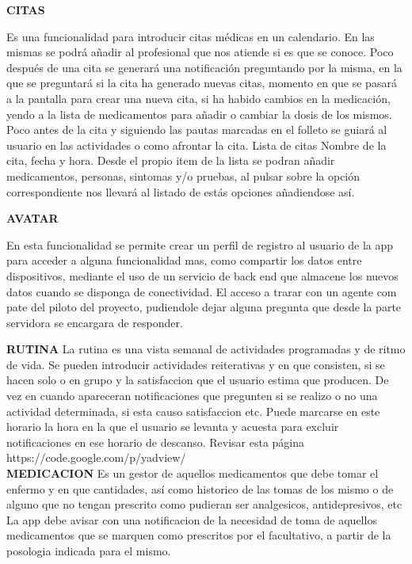 \documentclass[../pfc.tex]{subfiles}
\begin{document}
	\textbf{CITAS}
	
	Es una funcionalidad para introducir citas médicas en un calendario. En las mismas se podrá añadir al profesional que nos atiende si es que se conoce. 
	Poco después de una cita se generará una notificación preguntando por la misma, en la que se preguntará si la cita ha generado nuevas citas, momento en que se pasará a la pantalla para crear una nueva cita, si ha habido cambios en la medicación, yendo a la lista de medicamentos para añadir o cambiar la dosis de los mismos.
	Poco antes de la cita y siguiendo las pautas marcadas en el folleto se guiará al usuario en las actividades o como afrontar la cita.
	Lista de citas Nombre de la cita, fecha y hora.
	Desde el propio item de la lista se podran añadir medicamentos, personas, sintomas y/o pruebas, al pulsar sobre la opción correspondiente nos llevará al listado de estás opciones añadiendose así.
	
	\textbf{AVATAR}
	
	En esta funcionalidad se permite crear un perfil de registro al usuario de la app para acceder a alguna funcionalidad mas, como compartir los datos entre dispositivos, mediante el uso de un servicio de back end que almacene los nuevos datos cuando se disponga de conectividad. El acceso a trarar con un agente com pate del piloto del proyecto, pudiendole dejar alguna pregunta que desde la parte servidora se encargara de responder.

	\textbf{RUTINA}
	La rutina es una vista semanal de actividades programadas y de ritmo de vida. Se pueden introducir actividades reiterativas y en que consisten, si se hacen solo o en grupo y la satisfaccion que el usuario estima que producen. De vez en cuando apareceran notificaciones que pregunten si se realizo o no una actividad determinada, si esta causo satisfaccion etc. Puede marcarse en este horario la hora en la que el usuario se levanta y acuesta para excluir notificaciones en ese horario de descanso. 
	Revisar esta página
	https://code.google.com/p/yadview/\\
		
	
	\textbf{MEDICACION}
	Es un gestor de aquellos medicamentos que debe tomar el enfermo y en que cantidades, así como historico de las tomas de los mismo o de alguno que no tengan prescrito como pudieran ser analgesicos, antidepresivos, etc La app debe avisar con una notificacion de la necesidad de toma de aquellos medicamentos que se marquen como prescritos por el facultativo, a partir de la posologia indicada para el mismo. 
\end{document}
